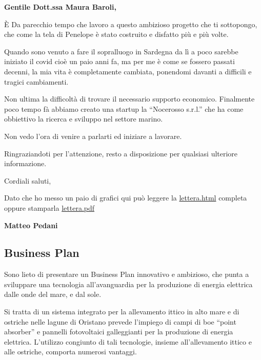 \documentclass[
  onecolumn]{report}
\author{Matteo Pedani}
\date{}
\begin{document}
\ifdefined\Shaded\renewenvironment{Shaded}{\begin{tcolorbox}[boxrule=0pt, borderline west={3pt}{0pt}{shadecolor}, sharp corners, breakable, interior hidden, enhanced, frame hidden]}{\end{tcolorbox}}\fi

\listoffigures
\listoftables
\textbf{Gentile Dott.ssa Maura Baroli,}

È Da parecchio tempo che lavoro a questo ambizioso progetto che ti
sottopongo, che come la tela di Penelope è stato costruito e disfatto
più e più volte.

Quando sono venuto a fare il sopralluogo in Sardegna da lì a poco
sarebbe iniziato il covid cioè un paio anni fa, ma per me è come se
fossero passati decenni, la mia vita è completamente cambiata, ponendomi
davanti a difficili e tragici cambiamenti.

Non ultima la difficoltà di trovare il necessario supporto economico.
Finalmente poco tempo fà abbiamo creato una startup la ``Nocerosso
s.r.l.'' che ha come obbiettivo la ricerca e sviluppo nel settore
marino.

Non vedo l'ora di venire a parlarti ed iniziare a lavorare.

Ringraziandoti per l'attenzione, resto a disposizione per qualsiasi
ulteriore informazione.

Cordiali saluti,

Dato che ho messo un paio di grafici qui può leggere la
\href{https://nocerosso.com/lettera.html}{lettera.html} completa oppure
stamparla \href{https://nocerosso.com/lettera.pdf}{lettera.pdf}

\textbf{Matteo Pedani}

\newpage

\hypertarget{business-plan}{%
\subsection{Business Plan}\label{business-plan}}

Sono lieto di presentare un Business Plan innovativo e ambizioso, che
punta a sviluppare una tecnologia all'avanguardia per la produzione di
energia elettrica dalle onde del mare, e dal sole.

Si tratta di un sistema integrato per la allevamento ittico in alto mare
e di ostriche nelle lagune di Oristano prevede l'impiego di campi di boe
``point absorber'' e pannelli fotovoltaici galleggianti per la
produzione di energia elettrica. L'utilizzo congiunto di tali
tecnologie, insieme all'allevamento ittico e alle ostriche, comporta
numerosi vantaggi.
\end{document}
